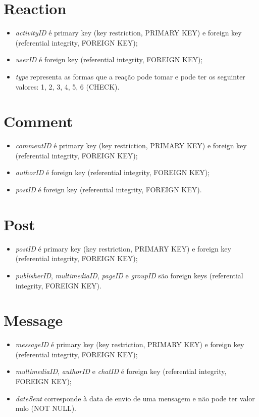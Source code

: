 \documentclass[12pt]{report}
\begin{document}
\section{Reaction}

\begin{itemize}
    \item \textit{activityID} é primary key (key restriction, PRIMARY KEY) e foreign key (referential integrity, FOREIGN KEY);
    \item \textit{userID} é foreign key (referential integrity, FOREIGN KEY);
    \item \textit{type} representa as formas que a reação pode tomar e pode ter os seguinter valores: 1, 2, 3, 4, 5, 6 (CHECK).
\end{itemize}

\section{Comment}

\begin{itemize}
    \item \textit{commentID} é primary key (key restriction, PRIMARY KEY) e foreign key (referential integrity, FOREIGN KEY);
    \item \textit{authorID} é foreign key (referential integrity, FOREIGN KEY);
    \item \textit{postID} é foreign key (referential integrity, FOREIGN KEY).
\end{itemize}

\section{Post}

\begin{itemize}
    \item \textit{postID} é primary key (key restriction, PRIMARY KEY) e foreign key (referential integrity, FOREIGN KEY);
    \item \textit{publisherID}, \textit{multimediaID}, \textit{pageID} e \textit{groupID} são foreign keys (referential integrity, FOREIGN KEY).
\end{itemize}
    
\section{Message}

\begin{itemize}
    \item \textit{messageID} é primary key (key restriction, PRIMARY KEY) e foreign key (referential integrity, FOREIGN KEY);
    \item \textit{multimediaID}, \textit{authorID} e \textit{chatID} é foreign key (referential integrity, FOREIGN KEY);
    \item \textit{dateSent} corresponde à data de envio de uma mensagem e não pode ter valor nulo (NOT NULL).
\end{itemize}
\end{document}
